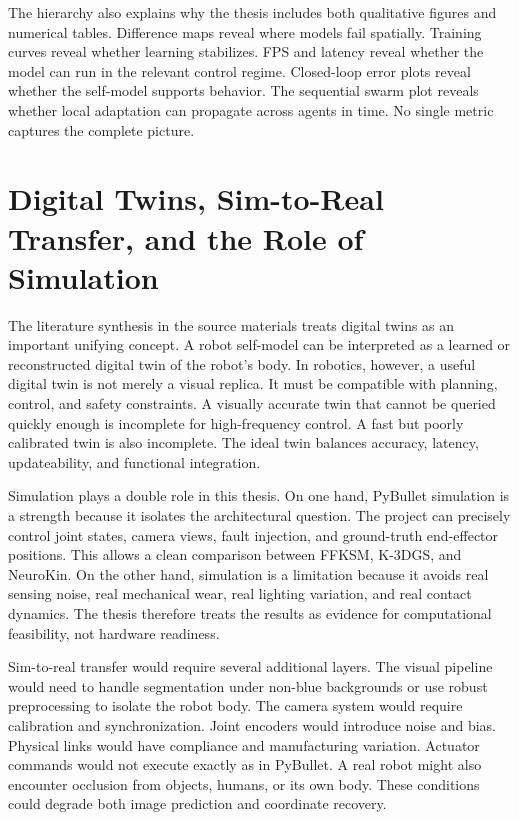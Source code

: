 \documentclass[12pt,a4paper,oneside]{report}
\begin{document}
The hierarchy also explains why the thesis includes both qualitative figures and numerical tables. Difference maps reveal where models fail spatially. Training curves reveal whether learning stabilizes. FPS and latency reveal whether the model can run in the relevant control regime. Closed-loop error plots reveal whether the self-model supports behavior. The sequential swarm plot reveals whether local adaptation can propagate across agents in time. No single metric captures the complete picture.

\section{Digital Twins, Sim-to-Real Transfer, and the Role of Simulation}

The literature synthesis in the source materials treats digital twins as an important unifying concept. A robot self-model can be interpreted as a learned or reconstructed digital twin of the robot's body. In robotics, however, a useful digital twin is not merely a visual replica. It must be compatible with planning, control, and safety constraints. A visually accurate twin that cannot be queried quickly enough is incomplete for high-frequency control. A fast but poorly calibrated twin is also incomplete. The ideal twin balances accuracy, latency, updateability, and functional integration.

Simulation plays a double role in this thesis. On one hand, PyBullet simulation is a strength because it isolates the architectural question. The project can precisely control joint states, camera views, fault injection, and ground-truth end-effector positions. This allows a clean comparison between FFKSM, K-3DGS, and NeuroKin. On the other hand, simulation is a limitation because it avoids real sensing noise, real mechanical wear, real lighting variation, and real contact dynamics. The thesis therefore treats the results as evidence for computational feasibility, not hardware readiness.

Sim-to-real transfer would require several additional layers. The visual pipeline would need to handle segmentation under non-blue backgrounds or use robust preprocessing to isolate the robot body. The camera system would require calibration and synchronization. Joint encoders would introduce noise and bias. Physical links would have compliance and manufacturing variation. Actuator commands would not execute exactly as in PyBullet. A real robot might also encounter occlusion from objects, humans, or its own body. These conditions could degrade both image prediction and coordinate recovery.
\end{document}
